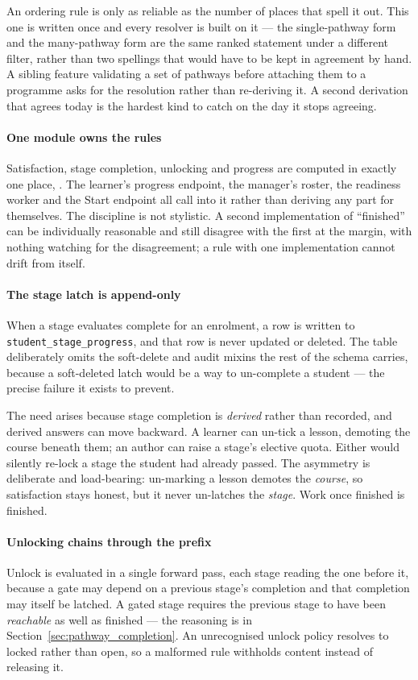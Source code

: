 An ordering rule is only as reliable as the number of places that spell it out. This one is written once and every resolver is built on it --- the single-pathway form and the many-pathway form are the same ranked statement under a different filter, rather than two spellings that would have to be kept in agreement by hand. A sibling feature validating a set of pathways before attaching them to a programme asks for the resolution rather than re-deriving it. A second derivation that agrees today is the hardest kind to catch on the day it stops agreeing.

\paragraph{One module owns the rules}
Satisfaction, stage completion, unlocking and progress are computed in exactly one place, . The learner's progress endpoint, the manager's roster, the readiness worker and the Start endpoint all call into it rather than deriving any part for themselves. The discipline is not stylistic. A second implementation of ``finished'' can be individually reasonable and still disagree with the first at the margin, with nothing watching for the disagreement; a rule with one implementation cannot drift from itself.

\paragraph{The stage latch is append-only}
When a stage evaluates complete for an enrolment, a row is written to \texttt{student\_stage\_progress}, and that row is never updated or deleted. The table deliberately omits the soft-delete and audit mixins the rest of the schema carries, because a soft-deleted latch would be a way to un-complete a student --- the precise failure it exists to prevent.

The need arises because stage completion is \emph{derived} rather than recorded, and derived answers can move backward. A learner can un-tick a lesson, demoting the course beneath them; an author can raise a stage's elective quota. Either would silently re-lock a stage the student had already passed. The asymmetry is deliberate and load-bearing: un-marking a lesson demotes the \emph{course}, so satisfaction stays honest, but it never un-latches the \emph{stage}. Work once finished is finished.

\paragraph{Unlocking chains through the prefix}
Unlock is evaluated in a single forward pass, each stage reading the one before it, because a gate may depend on a previous stage's completion and that completion may itself be latched. A gated stage requires the previous stage to have been \emph{reachable} as well as finished --- the reasoning is in Section~\ref{sec:pathway_completion}. An unrecognised unlock policy resolves to locked rather than open, so a malformed rule withholds content instead of releasing it.

